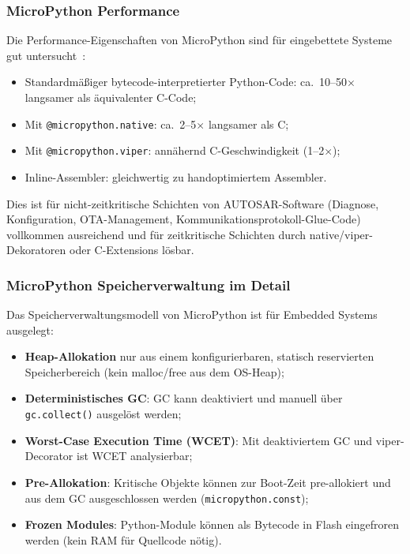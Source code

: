 ﻿\documentclass[12pt,a4paper,twoside]{article}
\begin{document}
\subsubsection{MicroPython Performance}
Die Performance-Eigenschaften von MicroPython sind für eingebettete Systeme
gut untersucht~\cite{micropython_perf_papanastasiou2021, python_embedded_benchmark2022}:

\begin{itemize}
  \item Standardmäßiger bytecode-interpretierter Python-Code:
        ca.\ 10--50$\times$ langsamer als äquivalenter C-Code;
  \item Mit \texttt{@micropython.native}: ca.\ 2--5$\times$ langsamer als C;
  \item Mit \texttt{@micropython.viper}: annähernd C-Geschwindigkeit (1--2$\times$);
  \item Inline-Assembler: gleichwertig zu handoptimiertem Assembler.
\end{itemize}

Dies ist für nicht-zeitkritische Schichten von AUTOSAR-Software
(Diagnose, Konfiguration, OTA-Management, Kommunikationsprotokoll-Glue-Code)
vollkommen ausreichend und für zeitkritische Schichten durch
native/viper-Dekoratoren oder C-Extensions lösbar.

\subsubsection{MicroPython Speicherverwaltung im Detail}
\label{subsubsec:gc}

Das Speicherverwaltungsmodell von MicroPython ist für Embedded Systems ausgelegt:

\begin{itemize}
  \item \textbf{Heap-Allokation} nur aus einem konfigurierbaren, statisch reservierten
        Speicherbereich (kein malloc/free aus dem OS-Heap);
  \item \textbf{Deterministisches GC}: GC kann deaktiviert und manuell über
        \texttt{gc.collect()} ausgelöst werden;
  \item \textbf{Worst-Case Execution Time (WCET)}: Mit deaktiviertem GC und
        viper-Decorator ist WCET analysierbar;
  \item \textbf{Pre-Allokation}: Kritische Objekte können zur Boot-Zeit
        pre-allokiert und aus dem GC ausgeschlossen werden (\texttt{micropython.const});
  \item \textbf{Frozen Modules}: Python-Module können als Bytecode in Flash
        eingefroren werden (kein RAM für Quellcode nötig).
\end{itemize}
\end{document}
